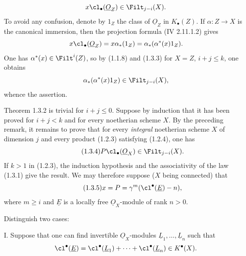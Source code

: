 %

\[
x\cl_\bullet(\underline{O}_Z)\in\Filt_{j-i}(X).
\]
To avoid any confusion, denote by $1_Z$ the class of $\underline{O}_Z$ in $K_\bullet(Z)$. If $\alpha:Z\to X$ is the canonical immersion, then the projection formula (IV 2.11.1.2) gives
\[
x\cl_\bullet(\underline{O}_Z)=x\alpha_*(1_Z)=\alpha_*(\alpha^*(x)1_Z).
\]
One has $\alpha^*(x)\in\Filt^i(Z)$, so by (1.1.8) and (1.3.3) for $X=Z$, $i+j\leq k$, one obtains
\[
\alpha_*(\alpha^*(x)1_Z)\in\Filt_{j-i}(X),
\]
whence the assertion.

Theorem 1.3.2 is trivial for $i+j\leq0$. Suppose by induction that it has been proved for $i+j<k$ and for every noetherian scheme $X$. By the preceding remark, it remains to prove that for every \emph{integral} noetherian scheme $X$ of dimension $j$ and every product (1.2.3) satisfying (1.2.4), one has
\begin{equation}\tag{1.3.4}
P\cl_\bullet(\underline{O}_X)\in\Filt_{j-i}(X).
\end{equation}
If $k>1$ in (1.2.3), the induction hypothesis and the associativity of the law (1.3.1) give the result. We may therefore suppose ($X$ being connected) that
\begin{equation}\tag{1.3.5}
x=P=\gamma^m(\cl^{\bullet}(\underline{E})-n),
\end{equation}
where $m\geq i$ and $\underline{E}$ is a locally free $\underline{O}_X$-module of rank $n>0$.

Distinguish two cases:

I. Suppose that one can find invertible $\underline{O}_X$-modules $\underline{L}_1,\ldots,\underline{L}_n$ such that
\[
\cl^{\bullet}(\underline{E})=\cl^{\bullet}(\underline{L}_1)+\cdots+\cl^{\bullet}(\underline{L}_n)\in K^{\bullet}(X).
\]


%

